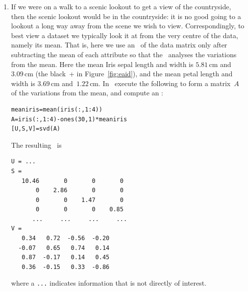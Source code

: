 \begin{example}
\begin{solution}
\begin{enumerate}
\item If we were on a walk to a scenic lookout to get a view of the countryside, then the scenic lookout would be in the countryside: it is no good going to a lookout a long way away from the scene we wish to view.
Correspondingly, to best view a dataset we typically look it at from the very centre of the data, namely its mean.
That is, here we use an \svd\ of the data matrix only after subtracting the mean of each attribute so that the \svd\ analyses the variations from the mean.
Here the mean Iris sepal length and width is \(5.81\)\,cm and~\(3.09\)\,cm (the black~+ in Figure~\ref{fig:eaid}), and the mean petal length and width is \(3.69\)\,cm and~\(1.22\)\,cm.
In \script\ execute the following to form a matrix~\(A\) of the variations from the mean, and compute an \svd:
\begin{verbatim}
meaniris=mean(iris(:,1:4))
A=iris(:,1:4)-ones(30,1)*meaniris
[U,S,V]=svd(A)
\end{verbatim}
\setbox\ajrqrbox\hbox{}%
\marginpar{\usebox{\ajrqrbox\\[2ex]}}%
The resulting \svd\ is \twodp
\begin{verbatim}
U = ...
S =
   10.46       0       0       0
       0    2.86       0       0
       0       0    1.47       0
       0       0       0    0.85
      ...     ...     ...     ...
V =
   0.34   0.72  -0.56  -0.20
  -0.07   0.65   0.74   0.14
   0.87  -0.17   0.14   0.45
   0.36  -0.15   0.33  -0.86
\end{verbatim}
where a \verb|...| indicates information that is not directly of interest.


\end{enumerate}
\end{solution}
\end{example}
